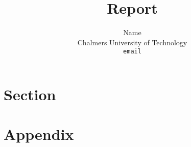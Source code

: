 \documentclass[a4paper,11pt]{article}
\begin{document}
\title{Report}
\author{Name \\
   Chalmers University of Technology \\
   \texttt{email}}

\maketitle

\begin{abstract}
\end{abstract}

\tableofcontents

\section{Section}

\section{Appendix}
\end{document}
